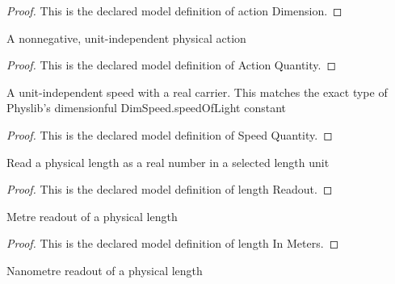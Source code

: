 \begin{proof}
  This is the declared model definition of action Dimension.
\end{proof}
\begin{definition}
  \label{def:physics:phyx-mini-0571:phyxminiproblems-problemphyxmini0571-actionquantity}
  A nonnegative, unit-independent physical action
\end{definition}
\begin{proof}
  This is the declared model definition of Action Quantity.
\end{proof}
\begin{definition}
  \label{def:physics:phyx-mini-0571:phyxminiproblems-problemphyxmini0571-speedquantity}
  A unit-independent speed with a real carrier. This matches the exact type of Physlib's dimensionful DimSpeed.speedOfLight constant
\end{definition}
\begin{proof}
  This is the declared model definition of Speed Quantity.
\end{proof}
\begin{definition}
  \label{def:physics:phyx-mini-0571:phyxminiproblems-problemphyxmini0571-lengthreadout}
  Read a physical length as a real number in a selected length unit
\end{definition}
\begin{proof}
  This is the declared model definition of length Readout.
\end{proof}
\begin{definition}
  \label{def:physics:phyx-mini-0571:phyxminiproblems-problemphyxmini0571-lengthinmeters}
  Metre readout of a physical length
\end{definition}
\begin{proof}
  This is the declared model definition of length In Meters.
\end{proof}
\begin{definition}
  \label{def:physics:phyx-mini-0571:phyxminiproblems-problemphyxmini0571-lengthinnanometers}
  Nanometre readout of a physical length
\end{definition}
